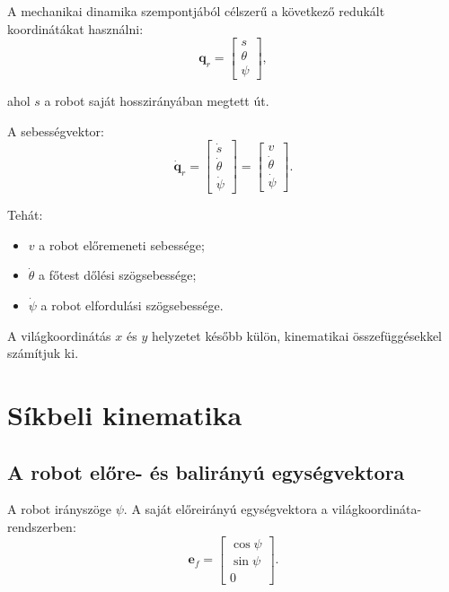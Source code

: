 \documentclass[12pt,a4paper]{article}
\begin{document}
	A mechanikai dinamika szempontjából célszerű a következő redukált koordinátákat használni:
	\begin{equation}
		\bm q_r=
		\begin{bmatrix}
			s\\
			\theta\\
			\psi
		\end{bmatrix},
	\end{equation}
	
	ahol $s$ a robot saját hosszirányában megtett út.
	
	A sebességvektor:
	\begin{equation}
		\dot{\bm q}_r=
		\begin{bmatrix}
			\dot s\\
			\dot\theta\\
			\dot\psi
		\end{bmatrix}
		=
		\begin{bmatrix}
			v\\
			\dot\theta\\
			\dot\psi
		\end{bmatrix}.
	\end{equation}
	
	Tehát:
	\begin{itemize}[leftmargin=2em]
		\item $v$ a robot előremeneti sebessége;
		\item $\dot\theta$ a főtest dőlési szögsebessége;
		\item $\dot\psi$ a robot elfordulási szögsebessége.
	\end{itemize}
	
	A világkoordinátás $x$ és $y$ helyzetet később külön, kinematikai összefüggésekkel számítjuk ki.
	
	\section{Síkbeli kinematika}
	
	\subsection{A robot előre- és balirányú egységvektora}
	
	A robot irányszöge $\psi$. A saját előreirányú egységvektora a világkoordináta-rendszerben:
	\begin{equation}
		\bm e_f=
		\begin{bmatrix}
			\cos\psi\\
			\sin\psi\\
			0
		\end{bmatrix}.
	\end{equation}
	
\end{document}
